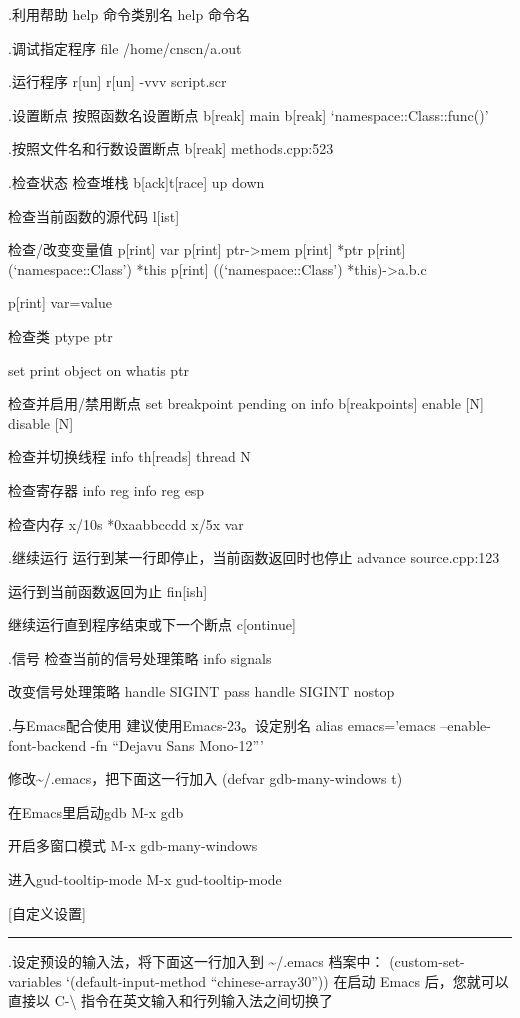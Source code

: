 \documentclass[11pt]{article}
\begin{document}
.利用帮助
 help 命令类别名
 help 命令名

.调试指定程序
 file  /home/cnscn/a.out

.运行程序
 r[un]
 r[un] -vvv script.scr

.设置断点
 按照函数名设置断点
 b[reak] main
 b[reak] `namespace::Class::func()'

.按照文件名和行数设置断点
 b[reak] methods.cpp:523

.检查状态
 检查堆栈
 b[ack]t[race]
 up
 down

 检查当前函数的源代码
 l[ist]

 检查/改变变量值
 p[rint] var
 p[rint] ptr->mem
 p[rint] *ptr
 p[rint] (`namespace::Class') *this
 p[rint] ((`namespace::Class') *this)->a.b.c

 p[rint] var=value

 检查类
 ptype ptr

 set print object on
 whatis ptr

 检查并启用/禁用断点
 set breakpoint pending on
 info b[reakpoints]
 enable [N]
 disable [N]

 检查并切换线程
 info th[reads]
 thread N

 检查寄存器
 info reg
 info reg esp

 检查内存
 x/10s *0xaabbccdd
 x/5x var

.继续运行
 运行到某一行即停止，当前函数返回时也停止
 advance source.cpp:123

 运行到当前函数返回为止
 fin[ish]

 继续运行直到程序结束或下一个断点
 c[ontinue]


.信号
 检查当前的信号处理策略
 info signals

 改变信号处理策略
 handle SIGINT pass
 handle SIGINT nostop


.与Emacs配合使用
 建议使用Emacs-23。设定别名
  alias emacs='emacs --enable-font-backend -fn ``Dejavu Sans Mono-12'''

 修改\~{}/.emacs，把下面这一行加入
 (defvar gdb-many-windows t)

 在Emacs里启动gdb
 M-x gdb

 开启多窗口模式
 M-x gdb-many-windows

 进入gud-tooltip-mode
 M-x gud-tooltip-mode

                       



[自定义设置]
\hrule
.设定预设的输入法，将下面这一行加入到 \~{}/.emacs 档案中：
 (custom-set-variables `(default-input-method ``chinese-array30''))
 在启动 Emacs 后，您就可以直接以 C-\textbackslash{} 指令在英文输入和行列输入法之间切换了
 
\end{document}
